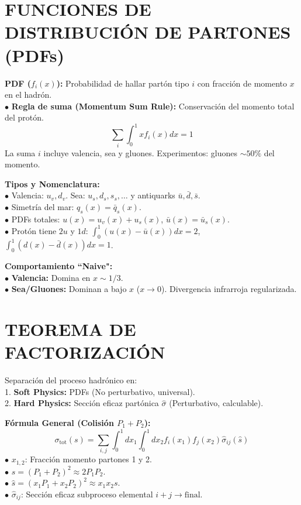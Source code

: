 \section{FUNCIONES DE DISTRIBUCIÓN DE PARTONES (PDFs)}
\textbf{PDF ($f_i(x)$):}
Probabilidad de hallar partón tipo $i$ con fracción de momento $x$ en el hadrón.\\
$\bullet$ \textbf{Regla de suma (Momentum Sum Rule):} Conservación del momento total del protón.
$$ \sum_{i} \int_0^1 x f_i(x) dx = 1 $$
La suma $i$ incluye valencia, sea y gluones. Experimentos: gluones $\sim 50\%$ del momento.

\textbf{Tipos y Nomenclatura:}\\
$\bullet$ Valencia: $u_v, d_v$. Sea: $u_s, d_s, s_s, \dots$ y antiquarks $\bar{u}, \bar{d}, \bar{s}$. \\
$\bullet$ Simetría del mar: $q_s(x) = \bar{q}_s(x)$. \\
$\bullet$ PDFs totales: $u(x) = u_v(x) + u_s(x)$, $\bar{u}(x) = \bar{u}_s(x)$. \\
$\bullet$ Protón tiene $2u$ y $1d$: $\int_0^1 (u(x)-\bar{u}(x))dx = 2$, $\int_0^1 (d(x)-\bar{d}(x))dx = 1$.

\textbf{Comportamiento ``Naive":}\\
$\bullet$ \textbf{Valencia:} Domina en $x \sim 1/3$. \\
$\bullet$ \textbf{Sea/Gluones:} Dominan a bajo $x$ ($x \to 0$). Divergencia infrarroja regularizada.

\section{TEOREMA DE FACTORIZACIÓN}
Separación del proceso hadrónico en:\\
1. \textbf{Soft Physics:} PDFs (No perturbativo, universal).\\
2. \textbf{Hard Physics:} Sección eficaz partónica $\hat{\sigma}$ (Perturbativo, calculable).

\textbf{Fórmula General (Colisión $P_1 + P_2$):}
$$ \sigma_{\text{tot}}(s) = \sum_{i,j} \int_0^1 dx_1 \int_0^1 dx_2 f_i(x_1) f_j(x_2) \hat{\sigma}_{ij}(\hat{s}) $$
$\bullet$ $x_{1,2}$: Fracción momento partones 1 y 2. \\
$\bullet$ $s = (P_1+P_2)^2 \approx 2P_1 P_2$. \\
$\bullet$ $\hat{s} = (x_1 P_1 + x_2 P_2)^2 \approx x_1 x_2 s$. \\
$\bullet$ $\hat{\sigma}_{ij}$: Sección eficaz subproceso elemental $i+j \to \text{final}$.



